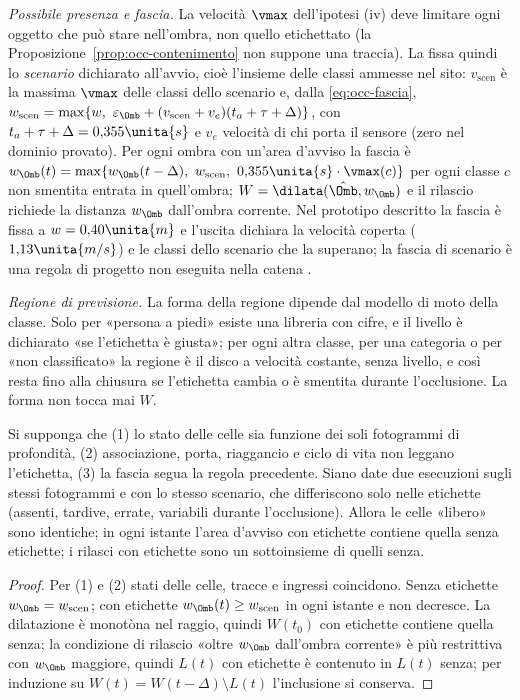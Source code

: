 \emph{Possibile presenza e fascia.} La velocità $\vmax$ dell'ipotesi (iv) deve limitare ogni oggetto che può stare nell'ombra, non quello etichettato (la Proposizione~\ref{prop:occ-contenimento} non suppone una traccia). La fissa quindi lo \emph{scenario} dichiarato all'avvio, cioè l'insieme delle classi ammesse nel sito: $v_{\mathrm{scen}}$ è la massima $\vmax$ delle classi dello scenario e, dalla \eqref{eq:occ-fascia}, $w_{\mathrm{scen}}=\max\{w,\ \varepsilon_\Omb+(v_{\mathrm{scen}}+v_e)(t_a+\tau+\Delta)\}$, con $t_a+\tau+\Delta=0{,}355\unita{s}$ e $v_e$ velocità di chi porta il sensore (zero nel dominio provato). Per ogni ombra con un'area d'avviso la fascia è $w_\Omb(t)=\max\{w_\Omb(t-\Delta),\ w_{\mathrm{scen}},\ 0{,}355\unita{s}\cdot\vmax(c)\}$ per ogni classe $c$ non smentita entrata in quell'ombra; $W=\dilata(\hat\Omb,w_\Omb)$ e il rilascio richiede la distanza $w_\Omb$ dall'ombra corrente. Nel prototipo descritto la fascia è fissa a $w=0{,}40\unita{m}$ e l'uscita dichiara la velocità coperta ($1{,}13\unita{m/s}$) e le classi dello scenario che la superano; la fascia di scenario è una regola di progetto non eseguita nella catena .

\emph{Regione di previsione.} La forma della regione dipende dal modello di moto della classe. Solo per «persona a piedi» esiste una libreria con cifre, e il livello è dichiarato «se l'etichetta è giusta»; per ogni altra classe, per una categoria o per «non classificato» la regione è il disco a velocità costante, senza livello, e così resta fino alla chiusura se l'etichetta cambia o è smentita durante l'occlusione. La forma non tocca mai $W$.

\begin{proposizione}\label{prop:occ-etichetta}
Si supponga che (1) lo stato delle celle sia funzione dei soli fotogrammi di profondità, (2) associazione, porta, riaggancio e ciclo di vita non leggano l'etichetta, (3) la fascia segua la regola precedente. Siano date due esecuzioni sugli stessi fotogrammi e con lo stesso scenario, che differiscono solo nelle etichette (assenti, tardive, errate, variabili durante l'occlusione). Allora le celle «libero» sono identiche; in ogni istante l'area d'avviso con etichette contiene quella senza etichette; i rilasci con etichette sono un sottoinsieme di quelli senza. 
\end{proposizione}
\begin{proof}
Per (1) e (2) stati delle celle, tracce e ingressi coincidono. Senza etichette $w_\Omb=w_{\mathrm{scen}}$; con etichette $w_\Omb(t)\ge w_{\mathrm{scen}}$ in ogni istante e non decresce. La dilatazione è monotòna nel raggio, quindi $W(t_0)$ con etichette contiene quella senza; la condizione di rilascio «oltre $w_\Omb$ dall'ombra corrente» è più restrittiva con $w_\Omb$ maggiore, quindi $L(t)$ con etichette è contenuto in $L(t)$ senza; per induzione su $W(t)=W(t-\Delta)\setminus L(t)$ l'inclusione si conserva.
\end{proof}

